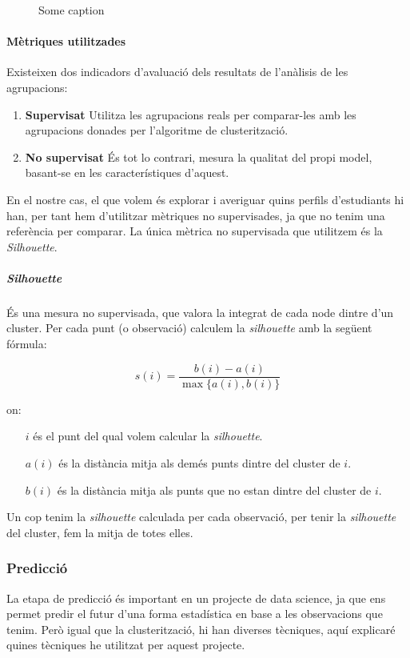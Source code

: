 \documentclass[12pt,a4paper,catalan]{article}
\begin{document}
\begin{figure}[h]
\centering
{}
\caption{Some caption}
\end{figure}

\newpage

\paragraph{Mètriques utilitzades}
Existeixen dos indicadors d'avaluació dels resultats de l'anàlisis de les agrupacions:
\begin{enumerate}
	\item \textbf{Supervisat} Utilitza les agrupacions reals per comparar-les amb les agrupacions donades per l'algoritme de clusterització.
	\item \textbf{No supervisat} És tot lo contrari, mesura la qualitat del propi model, basant-se en les característiques d'aquest.
\end{enumerate}

En el nostre cas, el que volem és explorar i averiguar quins perfils d'estudiants hi han, per tant hem d'utilitzar mètriques no supervisades, ja que no tenim una referència per comparar. La única mètrica no supervisada que utilitzem és la \textit{Silhouette}.

\subparagraph{\textit{Silhouette}}
És una mesura no supervisada, que valora la integrat de cada node dintre d'un cluster. Per cada punt (o observació) calculem la \textit{silhouette} amb la següent fórmula:

$$ s(i) = \frac{b(i) - a(i)}{\max\{a(i),b(i)\}} $$

on:
\begin{itemize}[leftmargin=.5in]
	\item [$i$] és el punt del qual volem calcular la \textit{silhouette}.
	\item [$a(i)$] és la distància mitja als demés punts dintre del cluster de $i$.
	\item [$b(i)$] és la distància mitja als punts que no estan dintre del cluster de $i$.
\end{itemize}

Un cop tenim la \textit{silhouette} calculada per cada observació, per tenir la \textit{silhouette} del cluster, fem la mitja de totes elles.

\newpage

\subsubsection{Predicció}
La etapa de predicció és important en un projecte de data science, ja que ens permet predir el futur d'una forma estadística en base a les observacions que tenim. Però igual que la clusterització, hi han diverses tècniques, aquí explicaré quines tècniques he utilitzat per aquest projecte.
\end{document}
